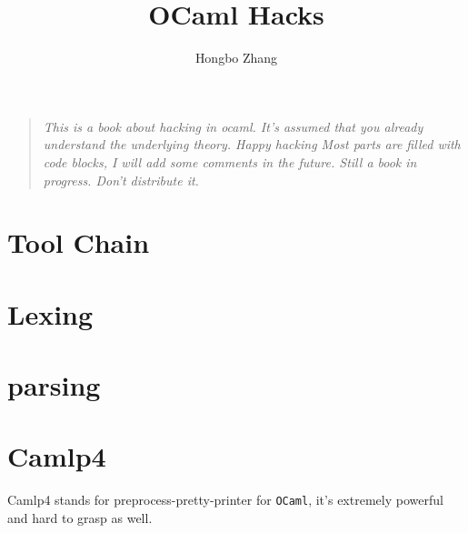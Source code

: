\documentclass[svgnames,12pt,a4paper]{report}
\begin{document}
\setcounter{tocdepth}{4}
\title{OCaml Hacks}
\author{Hongbo Zhang}

\maketitle
{}
\begin{quotation}
  \textit{ This is a book about hacking in ocaml.  It's assumed that
    you already understand the underlying theory. Happy hacking Most
    parts are filled with code blocks, I will add some comments in the
    future. Still a book in progress. Don't distribute it.}

\smiley
\end{quotation}



\newpage

\tableofcontents
\listoftodos
\vspace*{1cm}

\newpage



\newpage 
\chapter{Tool Chain}












\chapter{Lexing}



\chapter{parsing}
\label{sec:ocamlyacc}



\chapter{Camlp4}
\label{sec:camlp4}
Camlp4 stands for preprocess-pretty-printer for \verb|OCaml|, it's
extremely powerful and  hard to grasp as well.
  
  
  
  
  
  
  
  
  
\end{document}
